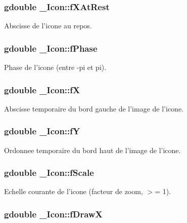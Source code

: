 \subsubsection{\setlength{\rightskip}{0pt plus 5cm}gdouble {\bf \_\-Icon::fXAtRest}}\label{struct__Icon_d5147013dfc5e46f0467d3514288585c}


Abscisse de l'icone au repos. 

\subsubsection{\setlength{\rightskip}{0pt plus 5cm}gdouble {\bf \_\-Icon::fPhase}}\label{struct__Icon_9d1f6eec88d30e739f6bb5c18a9f54ac}


Phase de l'icone (entre -pi et pi). 

\subsubsection{\setlength{\rightskip}{0pt plus 5cm}gdouble {\bf \_\-Icon::fX}}\label{struct__Icon_3a3122cc6289ff8ccb7d9b42a06d04a7}


Abscisse temporaire du bord gauche de l'image de l'icone. 

\subsubsection{\setlength{\rightskip}{0pt plus 5cm}gdouble {\bf \_\-Icon::fY}}\label{struct__Icon_f4a944821adc3537be4b446ff91cce97}


Ordonnee temporaire du bord haut de l'image de l'icone. 

\subsubsection{\setlength{\rightskip}{0pt plus 5cm}gdouble {\bf \_\-Icon::fScale}}\label{struct__Icon_846ecd1a0cbaa564754174d8f2c14eaa}


Echelle courante de l'icone (facteur de zoom, $>$= 1). 

\subsubsection{\setlength{\rightskip}{0pt plus 5cm}gdouble {\bf \_\-Icon::fDrawX}}\label{struct__Icon_34493db10621cd2a88a758d808ba1dc0}


